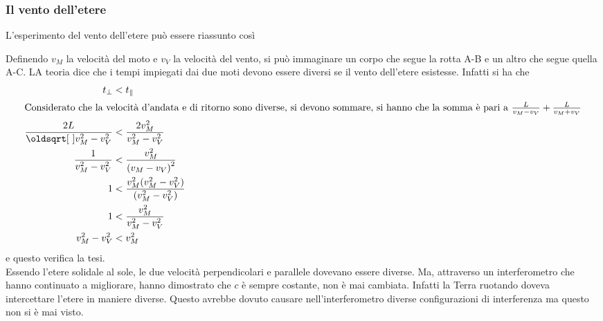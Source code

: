\subsubsection{Il vento dell'etere}
L'esperimento del vento dell'etere può essere riassunto così
\begin{center}
\end{center}
Definendo $v_M$ la velocità del moto e $v_V$ la velocità del vento, si può immaginare un corpo che
segue la rotta A-B e un altro che segue quella A-C. LA teoria dice che i tempi impiegati dai due 
moti devono essere diversi se il vento dell'etere esistesse. Infatti si ha che
\begin{align*}
  t_\perp&<t_\|\\
  \intertext{Considerato che la velocità d'andata e di ritorno sono diverse, si devono sommare, si
  hanno che la somma è pari a $\frac{L}{v_M-v_V} + \frac{L}{v_M+v_V}$}
  \frac{2L}{\sqrt{v_M^2-v_V^2}}&<\frac{2v_M^2}{v_M^2-v_V^2}\\
  \frac{1}{v_M^2-v_V^2}&<\frac{v_M^2}{{(v_M-v_V)}^2}\\
  1&<\frac{v_M^2(v_M^2-v_V^2)}{(v_M^2-v_V^2)}\\
  1&<\frac{v_M^2}{v_M^2-v_V^2}\\
  v_M^2-v_V^2&<v_M^2
\end{align*}
e questo verifica la tesi.\\ [\baselineskip]
Essendo l'etere solidale al sole, le due velocità perpendicolari e parallele dovevano essere
diverse. Ma, attraverso un interferometro che hanno continuato a migliorare, hanno dimostrato che
$c$ è sempre costante, non è mai cambiata. Infatti la Terra ruotando doveva intercettare l'etere
in maniere diverse. Questo avrebbe dovuto causare nell'interferometro diverse configurazioni di
interferenza ma questo non si è mai visto.

